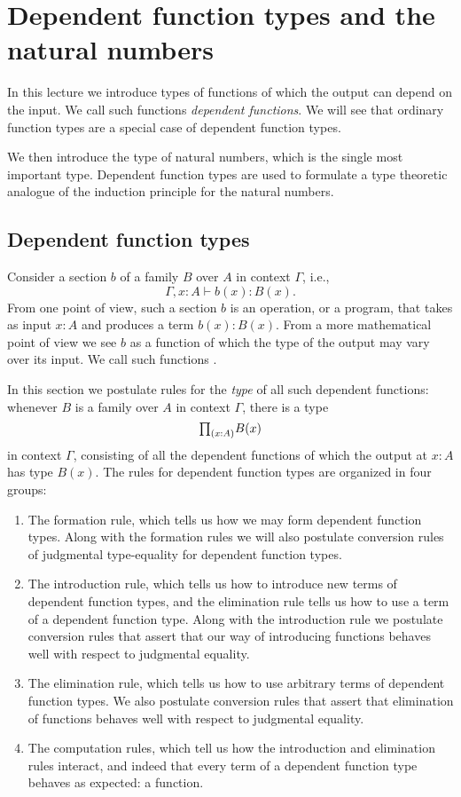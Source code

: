 \chapter{Dependent function types and the natural numbers}

In this lecture we introduce types of functions of which the output can depend on the input. We call such functions \emph{dependent functions}. We will see that ordinary function types are a special case of dependent function types.

We then introduce the type of natural numbers, which is the single most important type. Dependent function types are used to formulate a type theoretic analogue of the induction principle for the natural numbers.

\section{Dependent function types}
Consider a section $b$ of a family $B$ over $A$ in context $\Gamma$, i.e.,
\begin{equation*}
  \Gamma,x:A\vdash b(x):B(x).
\end{equation*}
From one point of view, such a section $b$ is an operation, or a program, that takes as input $x:A$ and produces a term $b(x):B(x)$. From a more mathematical point of view we see $b$ as a function of which the type of the output may vary over its input. We call such functions .

In this section we postulate rules for the \emph{type} of all such dependent functions: whenever $B$ is a family over $A$ in context $\Gamma$, there is a type
\begin{equation*}
  \prd{x:A}B(x)
\end{equation*}
in context $\Gamma$, consisting of all the dependent functions of which the output at $x:A$ has type $B(x)$. The rules for dependent function types are organized in four groups:
\begin{enumerate}
\item The formation rule, which tells us how we may form dependent function types. Along with the formation rules we will also postulate conversion rules of judgmental type-equality for dependent function types.
\item The introduction rule, which tells us how to introduce new terms of dependent function types, and the elimination rule tells us how to use a term of a dependent function type. Along with the introduction rule we postulate conversion rules that assert that our way of introducing functions behaves well with respect to judgmental equality.
\item The elimination rule, which tells us how to use arbitrary terms of dependent function types. We also postulate conversion rules that assert that elimination of functions behaves well with respect to judgmental equality.
\item The computation rules, which tell us how the introduction and elimination rules interact, and indeed that every term of a dependent function type behaves as expected: a function.
\end{enumerate}

